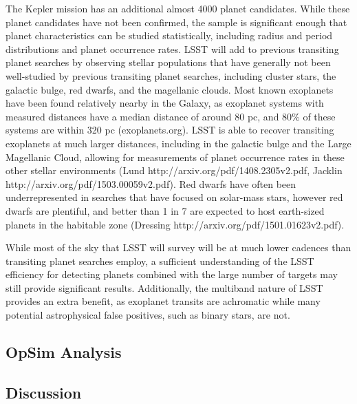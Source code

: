 The Kepler mission has an additional almost 4000 planet candidates. While these planet candidates have not been confirmed, the sample is significant enough that planet characteristics can be studied statistically, including radius and period distributions and planet occurrence rates. LSST will add to previous transiting planet searches by observing stellar populations that have generally not been well-studied by previous transiting planet searches, including cluster stars, the galactic bulge, red dwarfs, and the magellanic clouds. Most known exoplanets have been found relatively nearby in the Galaxy, as exoplanet systems with measured distances have a median distance of around 80 pc, and 80\% of these systems are within 320 pc (exoplanets.org). LSST is able to recover transiting exoplanets at much larger distances, including in the galactic bulge and the Large Magellanic Cloud, allowing for measurements of planet occurrence rates in these other stellar environments (Lund http://arxiv.org/pdf/1408.2305v2.pdf, Jacklin http://arxiv.org/pdf/1503.00059v2.pdf). Red dwarfs have often been underrepresented in searches that have focused on solar-mass stars, however red dwarfs are plentiful, and better than 1 in 7 are expected to host earth-sized planets in the habitable zone (Dressing http://arxiv.org/pdf/1501.01623v2.pdf).

While most of the sky that LSST will survey will be at much lower cadences than transiting planet searches employ, a sufficient understanding of the LSST efficiency for detecting planets combined with the large number of targets may still provide significant results. Additionally, the multiband nature of LSST provides an extra benefit, as exoplanet transits are achromatic while many potential astrophysical false positives, such as binary stars, are not.


\subsection{OpSim Analysis}
\label{sec:keyword:analysis}




\subsection{Discussion}
\label{sec:keyword:discussion}


\navigationbar
